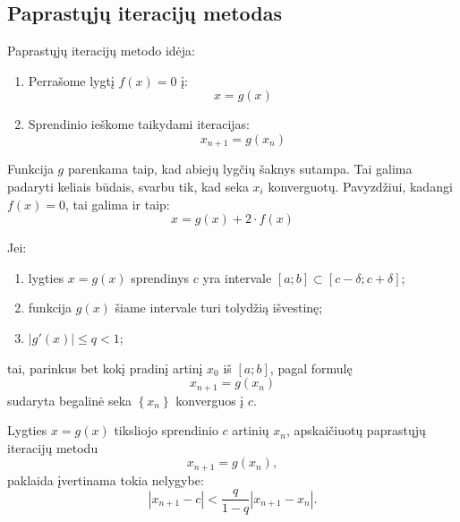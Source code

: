 \subsection{Paprastųjų iteracijų metodas}

\cite[26-31]{textbook}

Paprastųjų iteracijų metodo idėja:
\begin{enumerate}
  \item Perrašome lygtį $f(x) = 0$ į:
    \begin{equation*}
      x = g(x)
    \end{equation*}
  \item Sprendinio ieškome taikydami iteracijas:
    \begin{equation*}
      x_{n+1} = g(x_{n})
    \end{equation*}
\end{enumerate}

Funkcija $g$ parenkama taip, kad abiejų lygčių šaknys sutampa. Tai
galima padaryti keliais būdais, svarbu tik, kad seka $x_{i}$
konverguotų. Pavyzdžiui, kadangi $f(x) = 0$, tai galima ir taip:
\begin{equation*}
  x = g(x) + 2 \cdot f(x)
\end{equation*}

\begin{prop}
  \label{prop:SimpleIterationConvergance}
  Jei:
  \begin{enumerate}
    \item lygties $x = g(x)$ sprendinys $c$ yra intervale
      $\left[ a; b \right] \subset \left[ c - \delta; c + \delta \right]$;
    \item funkcija $g(x)$ šiame intervale turi tolydžią išvestinę;
    \item $|g'(x)| \leq q < 1$;
  \end{enumerate}
  tai, parinkus bet kokį pradinį artinį $x_{0}$ iš $\left[ a; b \right]$, pagal
  formulę
  \begin{equation*}
    x_{n+1} = g(x_{n})
  \end{equation*}
  sudaryta begalinė seka $\left\{ x_{n} \right\}$ konverguos į $c$.
\end{prop}

\begin{prop}
  Lygties $x = g(x)$ tiksliojo sprendinio $c$ artinių $x_{n}$, apskaičiuotų
  paprastųjų iteracijų metodu
  \begin{equation*}
    x_{n+1} = g(x_{n}),
  \end{equation*}
  paklaida įvertinama tokia nelygybe:
  \begin{equation*}
    |x_{n+1} - c| < \frac{q}{1 - q}|x_{n+1}-x_{n}|.
  \end{equation*}
\end{prop}

